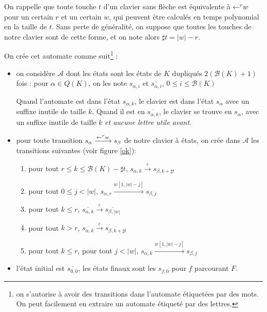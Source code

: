 \documentclass[12pt, a4paper]{article}
\renewcommand{\bar}{\overline}
\newcommand{\A}{\mathcal{A}}
\begin{document}
    On rappelle que \autocite[Lemme~74]{bible} toute touche $t$ d'un clavier sans flèche est équivalente à $\mathord{\leftarrow}^r w$ pour un certain $r$ et un certain $w$, qui peuvent être calculés en temps polynomial en la taille de $t$. Sans perte de généralité, on suppose que toutes les touches de notre clavier sont de cette forme, et on note alors $\sharp t = |w| - r$.
    
    On crée cet automate comme suit\footnote{on s'autorise à avoir des transitions dans l'automate étiquetées par des mots. On peut facilement en extraire un automate étiqueté par des lettres.} :
        \begin{itemize}
        \item on considère $\A$ dont les états sont les états de $K$ dupliqués $2(\mathcal{B}(K) + 1)$ fois : pour $\alpha \in Q(K)$, on les note $s_{\alpha, i}$ et $\overline{s_{\alpha, i}}$, $0 \leqslant i \leqslant \mathcal{B}(K)$
        \begin{example}[Intuition]    
            Quand l'automate est dans l'état $s_{\alpha,k}$, le clavier est dans l'état $s_\alpha$ avec un suffixe inutile de taille $k$. Quand il est en $\overline{s_{\alpha,k}}$, le clavier se trouve en $s_\alpha$, avec un suffixe inutile de taille $k$ \emph{et aucune lettre utile avant}. 
        \end{example}
        \item pour toute transition $s_{\alpha} \xrightarrow{\mathord{\leftarrow}^r w} s_{\beta}$ de notre clavier à états, on crée dans $\A$ les transitions suivantes (voir figure \ref{ok}):
            \begin{enumerate}
                \item pour tout $r \leqslant k \leqslant \mathcal{B}(K) - \sharp t$, $s_{\alpha, k} \xrightarrow{\varepsilon} s_{\beta, k + \sharp t}$
                \item pour tout $0 \leqslant j < |w|$, $s_{\alpha, r} \xrightarrow{w[1,|w|-j]} s_{\beta, j}$
                \item pour tout $k \leqslant r$, $\overline{s_{\alpha,k}} \xrightarrow{\varepsilon} \overline{s_{\beta,|w|}}$
                \item pour tout $k > r$, $\overline{s_{\alpha,k}} \xrightarrow{\varepsilon} \overline{s_{\beta,k+\sharp t}}$
                \item pour tout $k \leqslant r$, pour tout $j < |w|$, $\overline{s_{\alpha,k}} \xrightarrow{w[1,|w|-j]} s_{\beta, j}$
            \end{enumerate} 
        \item l'état initial est $\overline{s_{0,0}}$, les états finaux sont les $s_{f,0}$ pour $f$ parcourant $F$.
    \end{itemize}
    
\end{document}
